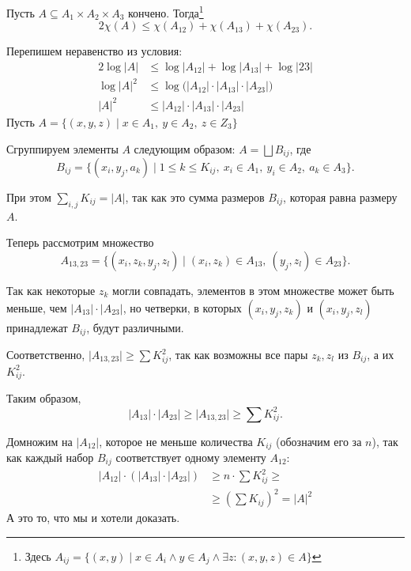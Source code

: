 \begin{lm}
	Пусть $ A \subseteq A_1 \times A_2 \times A_3$ кончено.
	Тогда\footnote{Здесь $ A_{ij} = \{(x, y) \mid x \in A_i \land y \in  A_j \land \exists z\colon  (x, y, z) \in A \}$}
	\[
		2 \chi(A) \le \chi(A_{12}) + \chi(A_{13}) + \chi(A_{23})
	.\] 
\end{lm}
\begin{proof*}
	Перепишем неравенство из условия:
	\begin{align*}
		2 \log \lvert A \rvert &\le \log \lvert A_{12} \rvert  + \log  \lvert A_{13} \rvert  + \log \lvert 23 \rvert  \\
		\log \lvert A \rvert^2 & \le \log \bigl(\lvert A_{12} \rvert \cdot \lvert A_{13} \rvert \cdot \lvert A_{23} \rvert\bigr)   \\
		\lvert A \rvert ^2 &\le \lvert A_{12} \rvert \cdot \lvert A_{13} \rvert \cdot \lvert A_{23} \rvert \tag{$ \log$  --- возрастающая функция}  
	\end{align*}
	Пусть $ A = \{(x, y, z) \mid x \in A_1 , ~ y \in A_2 , ~ z \in Z_3\}$

	Сгруппируем элементы $ A$ следующим образом: $ A = \bigsqcup B_{ij}$, где 
	$$ B_{ij} = \{(x_i, y_j, a_k) \mid 1 \le k \le K_{ij} , ~ x_i \in A_1 , ~ y_i \in  A_2 , ~ a_k \in A_3\}.$$

	При этом $ \sum_{i, j} K_{ij} = \lvert A \rvert $, так как это сумма размеров $ B_{ij}$, которая равна размеру $ A$. 
	
	Теперь рассмотрим множество 
	\[
		A_{13, 23} = \{(x_i, z_k, y_j, z_l) \mid (x_i, z_k) \in A_{13}, ~ (y_j, z_l)  \in A_{23}\}
	.\] 

	Так как некоторые $ z_k$ могли совпадать, элементов в этом множестве может быть меньше, чем   $ \lvert A_{13} \rvert \cdot \lvert A_{23} \rvert $, но четверки, в которых $ (x_i, y_j, z_k) $ и $ (x_i, y_j, z_l)$ принадлежат  $ B_{ij}$, будут различными. 

	Соответственно,  $ \lvert A_{13,23}  \rvert \ge \sum K_{ij}^2$, так как возможны все  пары $ z_k, z_l $ из $ B_{ij}$, а их $ K_{ij}^2$.

	Таким образом,
	\[
		\lvert A_{13} \rvert 	\cdot  \lvert A_{23} \rvert  \ge \lvert A_{13,23} \rvert \ge \sum K_{ij}^2 
	.\] 

	Домножим на $ \lvert A_{12} \rvert $, которое не меньше количества $ K_{ij}$ (обозначим его за $ n$), так как каждый набор $ B_{ij}$ соответствует одному элементу $ A_{12}$:
	\begin{align*}
		\lvert A_{12} \rvert  \cdot \left( \lvert A_{13} \rvert \cdot \lvert A_{23} \rvert   \right) &\ge  n \cdot \sum K_{ij}^2 \ge \tag{неравенство о средних} \\
																									 & \ge \left( \sum K_{ij} \right)^2 = \lvert A \rvert ^2 
	\end{align*}
	А это то, что мы и хотели доказать.
\end{proof*}

